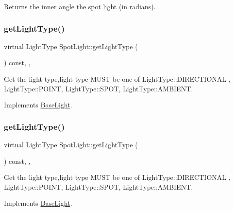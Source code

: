 Returns the inner angle the spot light (in radians). \mbox{\label{classSpotLight_aaf789b4d66aaff407f00d1fc4532fbfb}} 
\subsubsection{\texorpdfstring{get\+Light\+Type()}{getLightType()}\hspace{0.1cm}{\footnotesize\ttfamily [1/2]}}
{\footnotesize\ttfamily virtual Light\+Type Spot\+Light\+::get\+Light\+Type (\begin{DoxyParamCaption}{ }\end{DoxyParamCaption}) const\hspace{0.3cm}{\ttfamily [inline]}, {\ttfamily [override]}, {\ttfamily [virtual]}}

Get the light type,light type M\+U\+ST be one of Light\+Type\+::\+D\+I\+R\+E\+C\+T\+I\+O\+N\+AL , Light\+Type\+::\+P\+O\+I\+NT, Light\+Type\+::\+S\+P\+OT, Light\+Type\+::\+A\+M\+B\+I\+E\+NT. 

Implements \hyperlink{classBaseLight_a620db25fed828de7328b83587f388030}{Base\+Light}.

\mbox{\label{classSpotLight_aaf789b4d66aaff407f00d1fc4532fbfb}} 
\subsubsection{\texorpdfstring{get\+Light\+Type()}{getLightType()}\hspace{0.1cm}{\footnotesize\ttfamily [2/2]}}
{\footnotesize\ttfamily virtual Light\+Type Spot\+Light\+::get\+Light\+Type (\begin{DoxyParamCaption}{ }\end{DoxyParamCaption}) const\hspace{0.3cm}{\ttfamily [inline]}, {\ttfamily [override]}, {\ttfamily [virtual]}}

Get the light type,light type M\+U\+ST be one of Light\+Type\+::\+D\+I\+R\+E\+C\+T\+I\+O\+N\+AL , Light\+Type\+::\+P\+O\+I\+NT, Light\+Type\+::\+S\+P\+OT, Light\+Type\+::\+A\+M\+B\+I\+E\+NT. 

Implements \hyperlink{classBaseLight_a620db25fed828de7328b83587f388030}{Base\+Light}.

